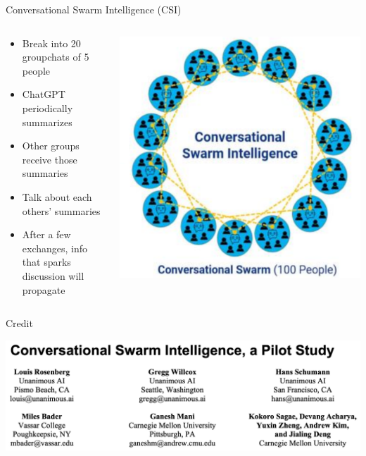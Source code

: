 \documentclass[aspectratio=169]{beamer}
\begin{document}
\begin{frame}{Conversational Swarm Intelligence (CSI)}
\begin{columns}[T]
    \begin{column}[T]{0.5\textwidth}
        \begin{itemize}
            \item Break into 20 groupchats of 5 people
            \item ChatGPT periodically summarizes
            \item Other groups receive those summaries
            \item Talk about each others' summaries
            \item After a few exchanges, info that sparks discussion will propagate
        \end{itemize}
    \end{column}
    \begin{column}{0.5\textwidth}
        \includegraphics[height=0.8\textheight]{imgs/CSI_section/conversational_swarm.png}
    \end{column}
\end{columns}
\end{frame}

\begin{frame}{Credit}
\vspace{-0.5in}
\begin{center}
\includegraphics[width=\textwidth]{imgs/CSI_section/authors.png}
\end{center}
\end{frame}
\end{document}
